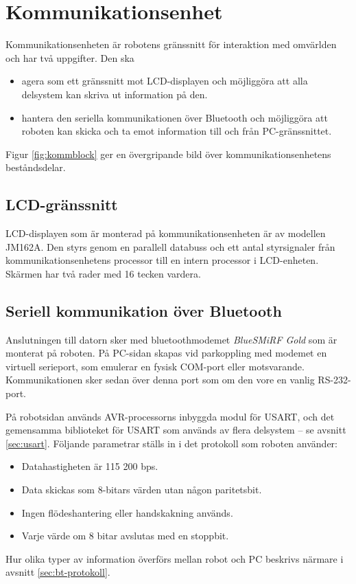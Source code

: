 \section{Kommunikationsenhet}
Kommunikationsenheten är robotens gränssnitt för interaktion med omvärlden och har två uppgifter. Den ska
\begin{itemize}
\item agera som ett gränssnitt mot LCD-displayen och möjliggöra att alla delsystem kan skriva ut information på den.
\item hantera den seriella kommunikationen över Bluetooth och möjliggöra att roboten kan skicka och ta emot information till och från PC-gränssnittet.
\end{itemize}

Figur \ref{fig:kommblock} ger en övergripande bild över kommunikationsenhetens beståndsdelar.


\subsection{LCD-gränssnitt}
LCD-displayen som är monterad på kommunikationsenheten är av modellen JM162A. Den styrs genom en parallell databuss och ett antal styrsignaler från kommunikationsenhetens processor till en intern processor i LCD-enheten. Skärmen har två rader med 16 tecken vardera.



\subsection{Seriell kommunikation över Bluetooth}
Anslutningen till datorn sker med bluetoothmodemet \emph{BlueSMiRF Gold} som är monterat på roboten. På PC-sidan skapas vid parkoppling med modemet en virtuell serieport, som emulerar en fysisk COM-port eller motsvarande. Kommunikationen sker sedan över denna port som om den vore en vanlig RS-232-port. 

På robotsidan används AVR-processorns inbyggda modul för USART, och det gemensamma biblioteket för USART som används av flera delsystem -- se avsnitt \ref{sec:usart}. Följande parametrar ställs in i det protokoll som roboten använder:
\begin{itemize}
\item Datahastigheten är 115 200 bps.
\item Data skickas som 8-bitars värden utan någon paritetsbit.
\item Ingen flödeshantering eller handskakning används.
\item Varje värde om 8 bitar avslutas med en stoppbit.
\end{itemize}

Hur olika typer av information överförs mellan robot och PC beskrivs närmare i avsnitt \ref{sec:bt-protokoll}.
